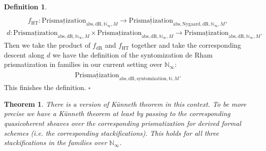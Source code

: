 \documentclass[12pt]{article}
\newtheorem{theorem}{Theorem}
\theoremstyle{definition}
\newtheorem{definition}{Definition}
\begin{document}
\begin{definition}
\begin{align}
\end{align}
\begin{align}
f_\mathrm{HT}: {\underline{\mathrm{Prismatization}}}_{\mathrm{abs},\mathrm{dR},\mathbb{N}_\infty,M}\rightarrow \overline{\underline{\mathrm{Prismatization}}}_{\mathrm{abs},\mathrm{Nygaard},\mathrm{dR},\mathbb{N}_\infty,M},
\end{align}
\begin{align}
d:  {\underline{\mathrm{Prismatization}}}_{\mathrm{abs},\mathrm{dR},\mathbb{N}_\infty,M}\times {\underline{\mathrm{Prismatization}}}_{\mathrm{abs},\mathrm{dR},\mathbb{N}_\infty,M} \rightarrow {\underline{\mathrm{Prismatization}}}_{\mathrm{abs},\mathrm{dR},\mathbb{N}_\infty,M}.
\end{align}
Then we take the product of $f_\mathrm{dR}$ and $f_\mathrm{HT}$ together and take the corresponding descent along $d$ we have the definition of the syntomization de Rham prismatization in families in our current setting over $\mathbb{N}_\infty$:
\begin{align}
\overline{\underline{\mathrm{Prismatization}}}_{\mathrm{abs},\mathrm{dR},\mathrm{syntomization},\mathbb{N},M}. 
\end{align}
This finishes the definition. $\square$
\end{definition}

\begin{theorem}
There is a version of K\"unneth theorem in this context. To be more precise we have a K\"unneth theorem at least by passing to the corresponding quasicoherent sheaves over the corresponding prismatization for derived formal schemes (i.e. the corresponding stackifications). This holds for all three stackifications in the families over $\mathbb{N}_\infty$. 
\end{theorem}
\end{document}
